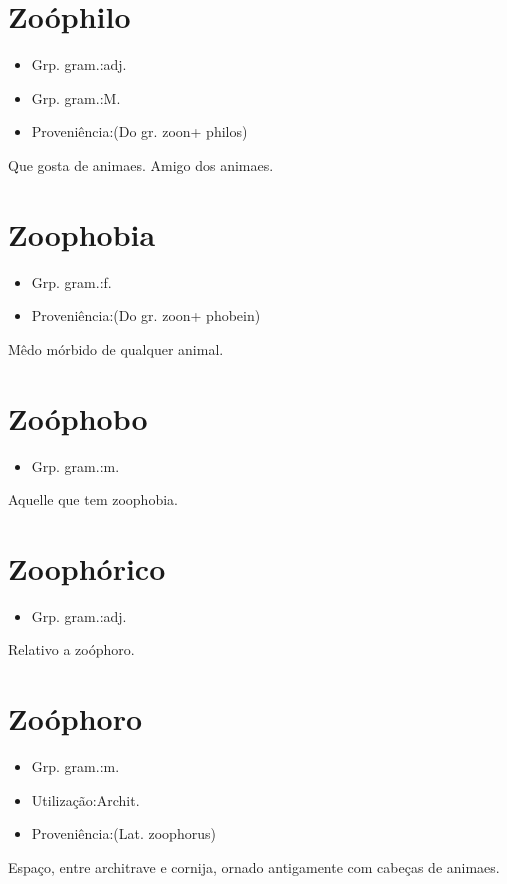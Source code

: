 \section{Zoóphilo}
\begin{itemize}
\item {Grp. gram.:adj.}
\end{itemize}
\begin{itemize}
\item {Grp. gram.:M.}
\end{itemize}
\begin{itemize}
\item {Proveniência:(Do gr. \textunderscore zoon\textunderscore  + \textunderscore philos\textunderscore )}
\end{itemize}
Que gosta de animaes.
Amigo dos animaes.
\section{Zoophobia}
\begin{itemize}
\item {Grp. gram.:f.}
\end{itemize}
\begin{itemize}
\item {Proveniência:(Do gr. \textunderscore zoon\textunderscore  + \textunderscore phobein\textunderscore )}
\end{itemize}
Mêdo mórbido de qualquer animal.
\section{Zoóphobo}
\begin{itemize}
\item {Grp. gram.:m.}
\end{itemize}
Aquelle que tem zoophobia.
\section{Zoophórico}
\begin{itemize}
\item {Grp. gram.:adj.}
\end{itemize}
Relativo a zoóphoro.
\section{Zoóphoro}
\begin{itemize}
\item {Grp. gram.:m.}
\end{itemize}
\begin{itemize}
\item {Utilização:Archit.}
\end{itemize}
\begin{itemize}
\item {Proveniência:(Lat. \textunderscore zoophorus\textunderscore )}
\end{itemize}
Espaço, entre architrave e cornija, ornado antigamente com cabeças de animaes.
